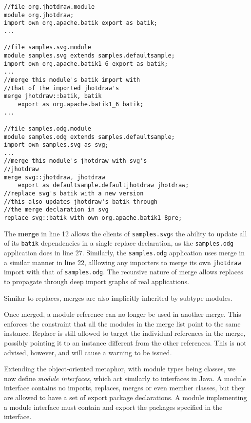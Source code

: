 \begin{lstlisting}[caption=Merge]
//file org.jhotdraw.module
module org.jhotdraw;
import own org.apache.batik export as batik;
...

//file samples.svg.module
module samples.svg extends samples.defaultsample;
import own org.apache.batik1_6 export as batik;
...
//merge this module's batik import with
//that of the imported jhotdraw's
merge jhotdraw::batik, batik 
	export as org.apache.batik1_6 batik;
...

//file samples.odg.module
module samples.odg extends samples.defaultsample;
import own samples.svg as svg;
...
//merge this module's jhotdraw with svg's
//jhotdraw
merge svg::jhotdraw, jhotdraw 
	export as defaultsample.defaultjhotdraw jhotdraw;
//replace svg's batik with a new version
//this also updates jhotdraw's batik through
//the merge declaration in svg
replace svg::batik with own org.apache.batik1_8pre;
\end{lstlisting}


The \textbf{merge} in line 12 allows the clients of \texttt{samples.svg}s
the ability to update all of its \texttt{batik} dependencies
in a single replace declaration, as the \texttt{samples.odg}
application does in line 27. Similarly, the \texttt{samples.odg} application
uses merge in a similar manner in line 22, alllowing any importers
to merge its own \texttt{jhotdraw} import with that of \texttt{samples.odg}.
The recursive nature of merge allows replaces to propagate through deep
import graphs of real applications.

Similar to replaces, merges are also implicitly inherited by subtype modules.

Once merged, a module reference can no longer be used in another merge. This
enforces the constraint that all the modules in the merge list point to the
same instance. Replace is still allowed to target the individual 
references in the merge, possibly pointing it to an instance different from
the other references. This is not advised, however, and will cause a warning to be
issued.


Extending the object-oriented metaphor, with module types being classes, we 
now define \textit{module interfaces}, which act similarly to interfaces in Java. A module
interface contains no imports, replaces, merges or even member classes, but they
are allowed to have a set of export package declarations. A module implementing
a module interface must contain and export the packages specified in the interface.

